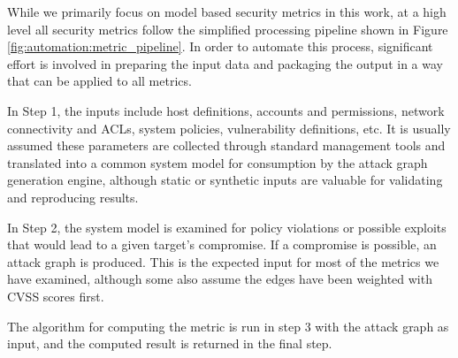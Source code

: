 


While we primarily focus on model based security metrics in this work, at a high level all security metrics follow the simplified processing pipeline shown in Figure \ref{fig:automation:metric_pipeline}. In order to automate this process, significant effort is involved in preparing the input data and packaging the output in a way that can be applied to all metrics.




In Step 1, the inputs include host definitions, accounts and permissions, network connectivity and ACLs, system policies, vulnerability definitions, etc. It is usually assumed these parameters are collected through standard management tools and translated into a common system model for consumption by the attack graph generation engine, although static or synthetic inputs are valuable for validating and reproducing results. 

In Step 2, the system model is examined for policy violations or possible exploits that would lead to a given target's compromise. If a compromise is possible, an attack graph is produced. This is the expected input for most of the metrics we have examined, although some also assume the edges have been weighted with CVSS scores first.

The algorithm for computing the metric is run in step 3 with the attack graph as input, and the computed result is returned in the final step. 

